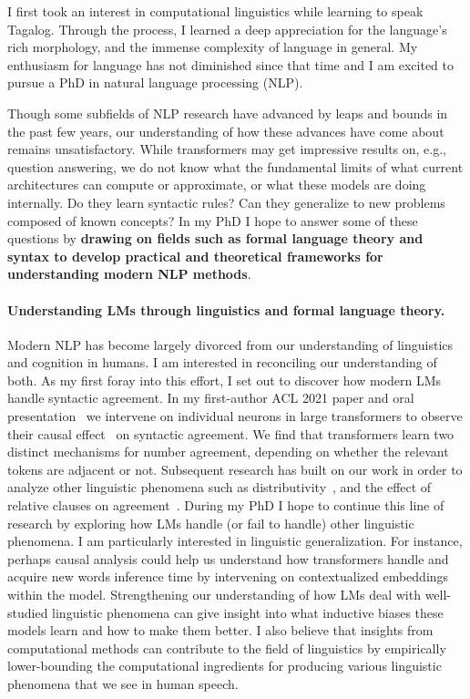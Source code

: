 \documentclass[12pt]{article}
\begin{document}
I first took an interest in computational linguistics 
while learning to speak Tagalog. 
Through the process, I learned a deep appreciation for the language's rich morphology,
and the immense complexity of language in general.
My enthusiasm for language has not diminished since that time
and I am excited to pursue a PhD in natural language processing (NLP).

Though some subfields of NLP research 
have advanced by leaps and bounds in the past few years,
our understanding of how these advances 
have come about remains unsatisfactory.
While transformers may get impressive results on, e.g., question answering,
we do not know what the fundamental limits 
of what current architectures can compute or approximate,
or what these models are doing internally.
Do they learn syntactic rules? 
Can they generalize to new problems composed of known concepts?
In my PhD I hope to answer some of these questions
by \textbf{drawing on fields such as formal language theory and syntax
to develop practical and theoretical frameworks 
for understanding modern NLP methods}.

\paragraph{Understanding LMs through linguistics and formal language theory.}
Modern NLP has become largely divorced 
from our understanding of linguistics and cognition in humans.
I am interested in reconciling our understanding of both.
As my first foray into this effort, I set out to 
discover how modern LMs handle syntactic agreement.
In my first-author ACL 2021 paper and oral presentation~\cite{Finlayson2021CausalAO}
we intervene on individual neurons in large transformers 
to observe their causal effect~\cite{Pearl2001DirectAI} on syntactic agreement.
We find that transformers learn 
two distinct mechanisms for number agreement,
depending on whether the relevant tokens are adjacent or not.
Subsequent research has built on our work 
in order to analyze other linguistic phenomena 
such as distributivity~\cite{Ban2022TestingPL},
and the effect of relative clauses on agreement~\cite{Ravfogel2021CounterfactualIR}.
During my PhD I hope to continue this line of research 
by exploring how LMs handle (or fail to handle) 
other linguistic phenomena. 
I am particularly interested in linguistic generalization.
For instance, perhaps causal analysis could help us understand
how transformers handle and acquire new words inference time
by intervening on contextualized embeddings within the model.
Strengthening our understanding of how 
LMs deal with well-studied linguistic phenomena
can give insight into what inductive biases these models learn 
and how to make them better. 
I also believe that insights from computational methods 
can contribute to the field of linguistics
by empirically lower-bounding the computational ingredients 
for producing various linguistic phenomena that we see in human speech.
\end{document}
